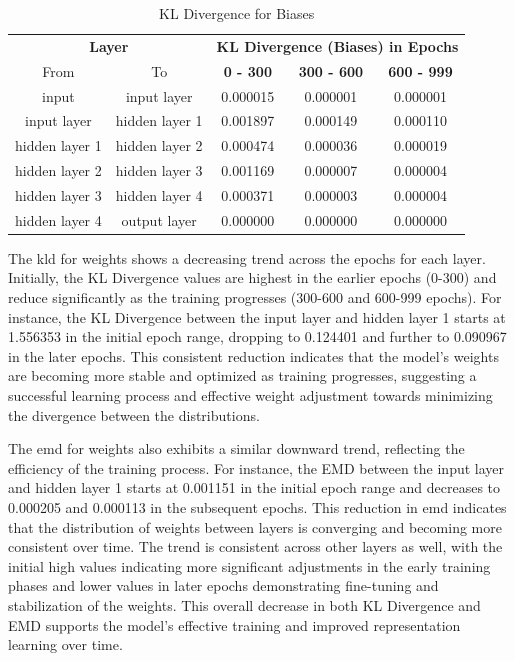 \documentclass{ioereport}
\begin{document}
    \begin{table}[H]
    \caption{KL Divergence for Biases}
    \centering
    \begin{tabular}{|c|c|c|c|c|}
    \hline
    \multicolumn{2}{|c|}{\textbf{Layer}} & \multicolumn{3}{c|}{\textbf{KL Divergence (Biases) in Epochs}} \\
    \cline{1-5}
    From & To & \textbf{0 - 300} & \textbf{300 - 600} & \textbf{600 - 999} \\
    \hline
    input & input layer & 0.000015 & 0.000001 & 0.000001 \\
    input layer & hidden layer 1 & 0.001897 & 0.000149 & 0.000110 \\
    hidden layer 1 & hidden layer 2 & 0.000474 & 0.000036 & 0.000019 \\
    hidden layer 2 & hidden layer 3 & 0.001169 & 0.000007 & 0.000004 \\
    hidden layer 3 & hidden layer 4 & 0.000371 & 0.000003 & 0.000004 \\
    hidden layer 4 & output layer & 0.000000 & 0.000000 & 0.000000 \\
    \hline
    \end{tabular}
    \end{table}

    
    The \gls{kld} for weights shows a decreasing trend across the epochs for each layer. Initially, the KL Divergence values are highest in the earlier epochs (0-300) and reduce significantly as the training progresses (300-600 and 600-999 epochs). For instance, the KL Divergence between the input layer and hidden layer 1 starts at 1.556353 in the initial epoch range, dropping to 0.124401 and further to 0.090967 in the later epochs. This consistent reduction indicates that the model's weights are becoming more stable and optimized as training progresses, suggesting a successful learning process and effective weight adjustment towards minimizing the divergence between the distributions.

    The \gls{emd} for weights also exhibits a similar downward trend, reflecting the efficiency of the training process. For instance, the EMD between the input layer and hidden layer 1 starts at 0.001151 in the initial epoch range and decreases to 0.000205 and 0.000113 in the subsequent epochs. This reduction in \gls{emd} indicates that the distribution of weights between layers is converging and becoming more consistent over time. The trend is consistent across other layers as well, with the initial high values indicating more significant adjustments in the early training phases and lower values in later epochs demonstrating fine-tuning and stabilization of the weights. This overall decrease in both KL Divergence and EMD supports the model's effective training and improved representation learning over time.
\end{document}
